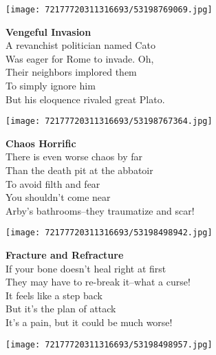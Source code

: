 \documentclass[10pt,letterpaper]{article}
\begin{document}
\begin{center}
\texttt{[image: 72177720311316693/53198769069.jpg]}
\end{center}

\begin{center}
\textbf{Vengeful Invasion}\\
\vskip 0.2in
A revanchist politician named Cato\\
Was eager for Rome to invade.  Oh,\\
Their neighbors implored them\\
To simply ignore him\\
But his eloquence rivaled great Plato.\\
\end{center}
\pagebreak

\begin{center}\texttt{[image: 72177720311316693/53198767364.jpg]}
\end{center}
\begin{center}
\textbf{Chaos Horrific}\\
\vskip 0.2in
There is even worse chaos by far\\
Than the death pit at the abbatoir\\
To avoid filth and fear\\
You shouldn't come near\\
Arby's bathrooms--they traumatize and scar!\\
\end{center}
\pagebreak

\begin{center}\texttt{[image: 72177720311316693/53198498942.jpg]}
\end{center}
\begin{center}
\textbf{Fracture and Refracture}\\
\vskip 0.2in
If your bone doesn't heal right at first\\
They may have to re-break it--what a curse!\\
It feels like a step back\\
But it's the plan of attack\\
It's a pain, but it could be much worse!\\
\end{center}
\pagebreak

\begin{center}
\texttt{[image: 72177720311316693/53198498957.jpg]}
\end{center}
\end{document}

